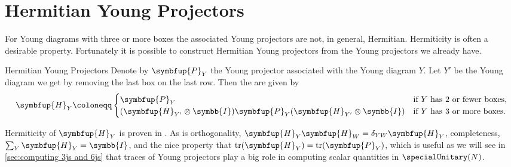\documentclass[fleqn]{NotesClass}
\newcommand{\identityMatrix}{\symbb{I}}
\newcommand{\projector}[1]{\symbfup{P}_{#1}}
\newcommand{\hermitianprojector}[1]{\symbfup{H}_{#1}}
\DeclareMathOperator{\tr}{tr}
\begin{document}
    \section{Hermitian Young Projectors}
    For Young diagrams with three or more boxes the associated Young projectors are not, in general, Hermitian.
    Hermiticity is often a desirable property.
    Fortunately it is possible to construct Hermitian Young projectors from the Young projectors we already have.
    
    \begin{dfn}{Hermitian Young Projectors}{}
        Denote by \(\projector{Y}\) the Young projector associated with the Young diagram \(Y\).
        Let \(Y'\) be the Young diagram we get by removing the last box on the last row.
        Then the  are given by
        \begin{equation}
            \hermitianprojector{Y} \coloneqq
            \begin{cases}
                \projector{Y} & \text{if } Y \text{ has 2 or fewer boxes},\\
                (\hermitianprojector{Y'} \otimes \identityMatrix) \projector{Y} (\hermitianprojector{Y'} \otimes \identityMatrix) & \text{if } Y \text{ has 3 or more boxes}.
            \end{cases}
        \end{equation}
    \end{dfn}
    
    Hermiticity of \(\symbfup{H}_{Y}\) is proven in \cite{keppeler-hermitian-young-projectors}.
    As is orthogonality, \(\hermitianprojector{Y}\hermitianprojector{W} = \delta_{YW}\hermitianprojector{Y}\), completeness, \(\sum_{Y} \hermitianprojector{Y} = \identityMatrix\), and the nice property that \(\tr(\hermitianprojector{Y}) = \tr(\projector{Y})\), which is useful as we will see in \cref{sec:computing 3js and 6js} that traces of Young projectors play a big role in computing scalar quantities in \(\specialUnitary(N)\).
    
\end{document}
